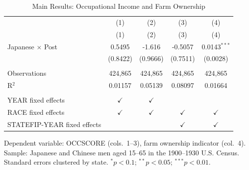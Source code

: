 \begin{table}[htbp]
   \caption{\label{tab:main} Main Results: Occupational Income and Farm Ownership}
   \bigskip
   \centering
   \begin{tabular}{lcccc}
      \toprule
                                  & (1)           & (2)           & (3)           & (4) \\   
                                  & (1)           & (2)           & (3)           & (4)\\  
      \midrule 
      Japanese $\times$ Post      & 0.5495        & -1.616        & -0.5057       & 0.0143$^{***}$\\   
                                  & (0.8422)      & (0.9666)      & (0.7511)      & (0.0028)\\   
       \\
      Observations                & 424,865       & 424,865       & 424,865       & 424,865\\  
      R$^2$                       & 0.01157       & 0.05139       & 0.08097       & 0.01664\\  
       \\
      YEAR fixed effects          & $\checkmark$  & $\checkmark$  &               & \\  
      RACE fixed effects          & $\checkmark$  & $\checkmark$  & $\checkmark$  & $\checkmark$\\   
      STATEFIP-YEAR fixed effects &               &               & $\checkmark$  & $\checkmark$\\   
      \bottomrule
   \end{tabular}
   
   \par \raggedright 
   Dependent variable: OCCSCORE (cols.~1--3), farm ownership indicator (col.~4). Sample: Japanese and Chinese men aged 15--65 in the 1900--1930 U.S. Census. Standard errors clustered by state. $^{*}p<0.1$; $^{**}p<0.05$; $^{***}p<0.01$.
\end{table}
